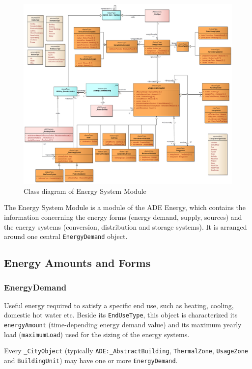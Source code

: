 \documentclass[a4paper,12pt]{article}
\begin{document}
\begin{figure}[htbp]
\centering
\includegraphics{fig/class_EnergySystem.png}
\caption{Class diagram of Energy System Module}
\end{figure}

The Energy System Module is a module of the ADE Energy, which contains
the information concerning the energy forms (energy demand, supply,
sources) and the energy systems (conversion, distribution and storage
systems). It is arranged around one central \texttt{EnergyDemand}
object.

\subsection{Energy Amounts and Forms}\label{energy-amounts-and-forms}

\subsubsection{EnergyDemand}\label{energydemand}

Useful energy required to satisfy a specific end use, such as heating,
cooling, domestic hot water etc. Beside its \texttt{EndUseType}, this
object is characterized its \texttt{energyAmount} (time-depending energy
demand value) and its maximum yearly load (\texttt{maximumLoad}) used
for the sizing of the energy systems.

Every \texttt{\_CityObject} (typically \texttt{ADE:\_AbstractBuilding},
\texttt{ThermalZone}, \texttt{UsageZone} and \texttt{BuildingUnit}) may
have one or more \texttt{EnergyDemand}.
\end{document}
